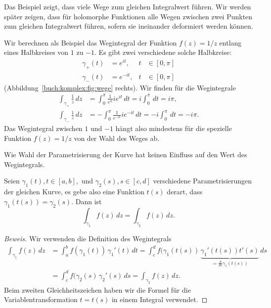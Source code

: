 Das Beispiel zeigt, dass viele Wege zum gleichen Integralwert führen.
Wir werden später zeigen, dass für holomorphe Funktionen alle
Wegen zwischen zwei Punkten zum gleichen Integralwert führen, sofern
sie ineinander deformiert werden können.

\begin{beispiel}
Wir berechnen als Beispiel das Wegintegral der Funktion $f(z)=1/z$ entlang
eines Halbkreises von $1$ zu $-1$.
Es gibt zwei verschiedene solche Halbkreise:
\begin{equation*}
\begin{aligned}
\gamma_+(t)&=e^{it},&t&\in[0,\pi]
\\
\gamma_-(t)&=e^{-it},&t&\in[0,\pi]
\end{aligned}
\end{equation*}
(Abbildung~\ref{buch:komplex:fig:wege} rechts).
Wir finden für die Wegintegrale
\begin{align*}
\int_{\gamma_+}\frac1z\,dz
&=
\int_0^\pi \frac1{e^{it}}ie^{it}\,dt=i\int_0^\pi\,dt=i\pi,
\\
\int_{\gamma_-}\frac1z\,dz
&=
-\int_0^\pi \frac1{e^{-it}}ie^{-it}\,dt=-i\int_0^\pi\,dt=-i\pi.
\end{align*}
Das Wegintegral zwischen $1$ und $-1$ hängt also mindestens für die
spezielle Funktion $f(z)=1/z$ von der Wahl des Weges ab.
\end{beispiel}

Wie Wahl der Parametrisierung der Kurve hat keinen Einfluss auf den
Wert des Wegintegrals.

\begin{satz}
%
Seien $\gamma_1(t), t\in[a,b],$ und $\gamma_2(s),s\in[c,d]$
verschiedene Parametrisierungen
%
der gleichen Kurve, es gebe also eine Funktion $t(s)$ derart, dass
$\gamma_1(t(s))=\gamma_2(s)$.
Dann ist
\[
\int_{\gamma_1}f(z)\,dz
=
\int_{\gamma_2}f(z)\,dz.
\]
\end{satz}

\begin{proof}[Beweis]
Wir verwenden die Definition des Wegintegrals
\begin{align*}
\int_{\gamma_1} f(z)\,dz
&=
\int_a^b f(\gamma_1(t))\,\gamma_1'(t)\,dt
=
\int_c^d f(\gamma_1(t(s))\,\underbrace{\gamma_1'(t(s)) t'(s)}_{\displaystyle
=\frac{d}{ds}\gamma_1(t(s))}\,ds
\\
&=
\int_c^d f(\gamma_2(s)\,\gamma_2'(s)\,ds
=
\int_{\gamma_2}f(z)\,dz.
\end{align*}
Beim zweiten Gleichheitszeichen haben wir die Formel für die
Variablentransformation $t=t(s)$ in einem Integral verwendet.
%
\end{proof}

